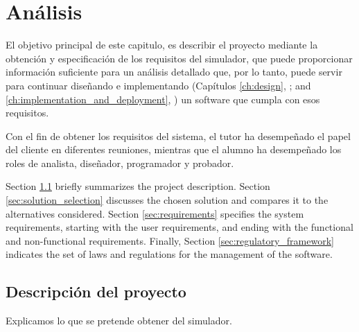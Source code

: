 \chead[]{}
\renewcommand{\headrulewidth}{0.5pt}

\lfoot[]{}
\cfoot[]{}
\rfoot[]{}
\renewcommand{\footrulewidth}{0pt}

\chapter{Análisis}
\label{ch:analysis}

El objetivo principal de este capitulo, es describir el proyecto mediante la obtención y especificación de los requisitos del simulador, que puede proporcionar información suficiente para un análisis detallado que, por lo tanto, puede servir para continuar diseñando e implementando (Capítulos \ref{ch:design}, \textit{}; and \ref{ch:implementation_and_deployment}, \textit{}) un software que cumpla con esos requisitos. 

Con el fin de obtener los requisitos del sistema, el tutor ha desempeñado el papel del cliente en diferentes reuniones, mientras que el alumno ha desempeñado los roles de analista, diseñador, programador y probador.

Section \ref{sec:project_description} briefly summarizes the project description. Section \ref{sec:solution_selection} discusses the chosen solution and compares it to the alternatives considered. Section \ref{sec:requirements} specifies the system requirements, starting with the user requirements, and ending with the functional and non-functional requirements. Finally, Section \ref{sec:regulatory_framework} indicates the set of laws and regulations for the management of the software.

\section{Descripción del proyecto}
\label{sec:project_description}

Explicamos lo que se pretende obtener del simulador.

